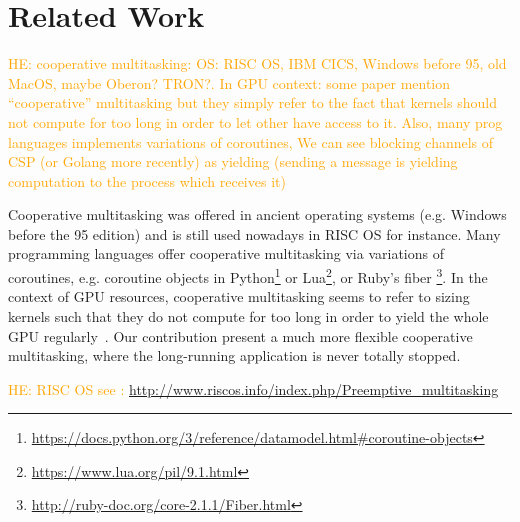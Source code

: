 \documentclass[numbers,nocopyrightspace,10pt]{sigplanconf}
\newcommand{\HEComment}[1]{\textcolor{orange}{HE: #1}}
\begin{document}
\section{Related Work}\label{sec:relatedwork}

\HEComment{cooperative multitasking: OS: RISC OS, IBM CICS, Windows
  before 95, old MacOS, maybe Oberon? TRON?. In GPU context: some
  paper mention ``cooperative'' multitasking but they simply refer to
  the fact that kernels should not compute for too long in order to
  let other have access to it. Also, many prog languages implements
  variations of coroutines, We can see blocking channels of CSP (or
  Golang more recently) as yielding (sending a message is yielding
  computation to the process which receives it)}

Cooperative multitasking was offered in ancient operating systems
(e.g. Windows before the 95 edition) and is still used nowadays in
RISC OS for instance. Many programming languages offer cooperative
multitasking via variations of coroutines, e.g. coroutine objects in
Python\footnote{\url{https://docs.python.org/3/reference/datamodel.html\#coroutine-objects}}
or Lua\footnote{\url{https://www.lua.org/pil/9.1.html}}, or Ruby's
fiber \footnote{\url{http://ruby-doc.org/core-2.1.1/Fiber.html}}. In
the context of GPU resources, cooperative multitasking seems to refer
to sizing kernels such that they do not compute for too long in order
to yield the whole GPU regularly~\cite{adriaens2012case}. Our
contribution present a much more flexible cooperative multitasking,
where the long-running application is never totally stopped.

\HEComment{ RISC OS see :
\url{http://www.riscos.info/index.php/Preemptive_multitasking}
}




\end{document}
